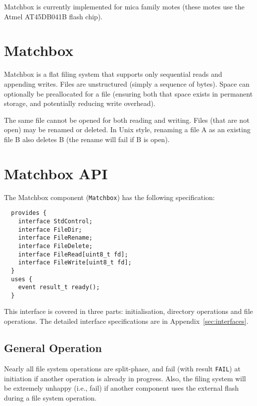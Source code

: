\documentclass[10pt]{article}
\newcommand{\kw}[1]{\mbox{\tt #1}}
\begin{document}
Matchbox is currently implemented for mica family motes (these motes use
the Atmel AT45DB041B flash chip).

\section{Matchbox}

Matchbox is a flat filing system that supports only sequential reads and
appending writes. Files are unstructured (simply a sequence of
bytes). Space can optionally be preallocated for a file (ensuring both that
space exists in permanent storage, and potentially reducing write
overhead).

The same file cannot be opened for both reading and writing. Files (that
are not open) may be renamed or deleted. In Unix style, renaming a file A
as an existing file B also deletes B (the rename will fail if B is open).

\section{Matchbox API}

The Matchbox component (\kw{Matchbox}) has the following specification:

\begin{verbatim}
  provides {
    interface StdControl;
    interface FileDir;
    interface FileRename;
    interface FileDelete;
    interface FileRead[uint8_t fd];
    interface FileWrite[uint8_t fd];
  }
  uses {
    event result_t ready();
  }
\end{verbatim}

This interface is covered in three parts: initialisation, directory
operations and file operations. The detailed interface specifications are
in Appendix~\ref{sec:interfaces}.

\subsection{General Operation}

Nearly all file system operations are split-phase, and fail (with result
\kw{FAIL}) at initiation if another operation is already in progress. Also,
the filing system will be extremely unhappy (i.e., fail) if another
component uses the external flash during a file system operation.
\end{document}
